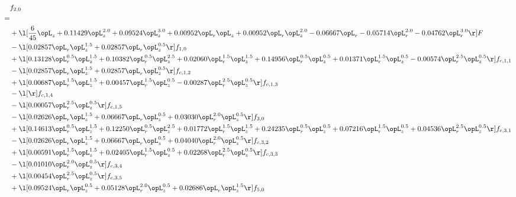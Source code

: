 \begin{alignat}{2} 
\label{eq:f_20_1} 
& f_{2,0} \nonumber \\ 
 = \\ 
& + \l[ \frac{6}{45} \opL_z +  0.11429 \opL_z^{2.0} +  0.09524 \opL_z^{3.0} +  0.00952 \opL_r \opL_z +  0.00952 \opL_r \opL_z^{2.0}   -0.06667 \opL_r   -0.05714 \opL_r^{2.0}   -0.04762 \opL_r^{3.0}  \r] F \nonumber \\ 
& - \l[  0.02857 \opL_r \opL_z^{1.5} +  0.02857 \opL_r \opL_z^{0.5}  \r] f_{1,0} \nonumber \\ 
& + \l[  0.13128 \opL_r^{0.5} \opL_z^{1.5} +  0.10382 \opL_r^{0.5} \opL_z^{2.5} +  0.02060 \opL_r^{1.5} \opL_z^{1.5} +  0.14956 \opL_r^{0.5} \opL_z^{0.5} +  0.01371 \opL_r^{1.5} \opL_z^{0.5}   -0.00574 \opL_r^{2.5} \opL_z^{0.5}  \r] f_{c,1,1} \nonumber \\ 
& - \l[  0.02857 \opL_r \opL_z^{1.5} +  0.02857 \opL_r \opL_z^{0.5}  \r] f_{c,1,2} \nonumber \\ 
& + \l[  0.00687 \opL_r^{1.5} \opL_z^{1.5} +  0.00457 \opL_r^{1.5} \opL_z^{0.5}   -0.00287 \opL_r^{2.5} \opL_z^{0.5}  \r] f_{c,1,3} \nonumber \\ 
& - \l[  \r] f_{c,1,4} \nonumber \\ 
& - \l[  0.00057 \opL_r^{2.5} \opL_z^{0.5}  \r] f_{c,1,5} \nonumber \\ 
& - \l[  0.02626 \opL_r \opL_z^{1.5} +  0.06667 \opL_r \opL_z^{0.5} +  0.03030 \opL_r^{2.0} \opL_z^{0.5}  \r] f_{3,0} \nonumber \\ 
& + \l[  0.14613 \opL_r^{0.5} \opL_z^{1.5} +  0.12250 \opL_r^{0.5} \opL_z^{2.5} +  0.01772 \opL_r^{1.5} \opL_z^{1.5} +  0.24235 \opL_r^{0.5} \opL_z^{0.5} +  0.07216 \opL_r^{1.5} \opL_z^{0.5} +  0.04536 \opL_r^{2.5} \opL_z^{0.5}  \r] f_{c,3,1} \nonumber \\ 
& - \l[  0.02626 \opL_r \opL_z^{1.5} +  0.06667 \opL_r \opL_z^{0.5} +  0.04040 \opL_r^{2.0} \opL_z^{0.5}  \r] f_{c,3,2} \nonumber \\ 
& + \l[  0.00591 \opL_r^{1.5} \opL_z^{1.5} +  0.02405 \opL_r^{1.5} \opL_z^{0.5} +  0.02268 \opL_r^{2.5} \opL_z^{0.5}  \r] f_{c,3,3} \nonumber \\ 
& - \l[  0.01010 \opL_r^{2.0} \opL_z^{0.5}  \r] f_{c,3,4} \nonumber \\ 
& + \l[  0.00454 \opL_r^{2.5} \opL_z^{0.5}  \r] f_{c,3,5} \nonumber \\ 
& + \l[  0.09524 \opL_r \opL_z^{0.5} +  0.05128 \opL_r^{2.0} \opL_z^{0.5} +  0.02686 \opL_r \opL_z^{1.5}  \r] f_{5,0} \nonumber \\ 

\end{alignat}
